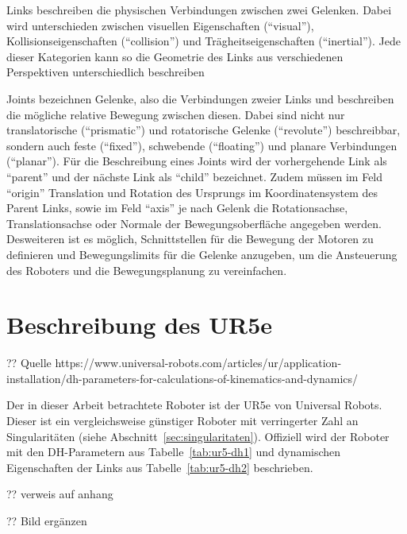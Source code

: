 Links beschreiben die physischen Verbindungen zwischen zwei Gelenken.
Dabei wird unterschieden zwischen visuellen Eigenschaften (\enquote{visual}), Kollisionseigenschaften (\enquote{collision}) und Trägheitseigenschaften (\enquote{inertial}).
Jede dieser Kategorien kann so die Geometrie des Links aus verschiedenen Perspektiven unterschiedlich beschreiben

Joints bezeichnen Gelenke, also die Verbindungen zweier Links und beschreiben die mögliche relative Bewegung zwischen diesen.
Dabei sind nicht nur translatorische (\enquote{prismatic}) und rotatorische Gelenke (\enquote{revolute}) beschreibbar, sondern auch feste (\enquote{fixed}), schwebende (\enquote{floating}) und planare Verbindungen (\enquote{planar}).
Für die Beschreibung eines Joints wird der vorhergehende Link als \enquote{parent} und der nächste Link als \enquote{child} bezeichnet.
Zudem müssen im Feld \enquote{origin} Translation und Rotation des Ursprungs im Koordinatensystem des Parent Links, sowie im Feld \enquote{axis} je nach Gelenk die Rotationsachse, Translationsachse oder Normale der Bewegungsoberfläche angegeben werden.
Desweiteren ist es möglich, Schnittstellen für die Bewegung der Motoren zu definieren und Bewegungslimits für die Gelenke anzugeben, um die Ansteuerung des Roboters und die Bewegungsplanung zu vereinfachen.


\section{Beschreibung des UR5e}\label{sec:ur5-in-dh}
?? Quelle https://www.universal-robots.com/articles/ur/application-installation/dh-parameters-for-calculations-of-kinematics-and-dynamics/

Der in dieser Arbeit betrachtete Roboter ist der UR5e von Universal Robots.
Dieser ist ein vergleichsweise günstiger Roboter mit verringerter Zahl an Singularitäten (siehe Abschnitt~\ref{sec:singularitaten}).
Offiziell wird der Roboter mit den DH-Parametern aus Tabelle~\ref{tab:ur5-dh1} und dynamischen Eigenschaften der Links aus Tabelle~\ref{tab:ur5-dh2} beschrieben.

?? verweis auf anhang

?? Bild ergänzen

